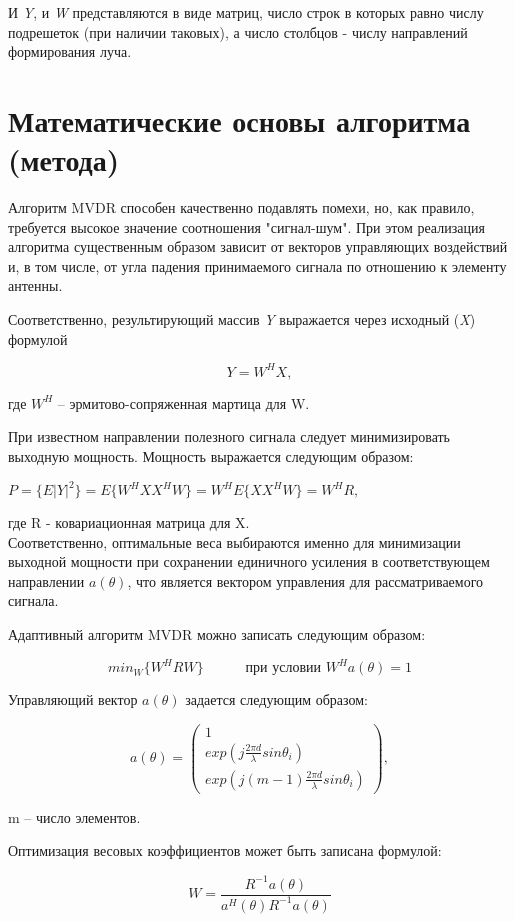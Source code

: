 \documentclass{article}
\begin{document}
И \textit{Y}, и \textit{W} представляются в виде матриц, число строк в которых равно числу подрешеток (при наличии таковых), а число столбцов - числу направлений формирования луча.


\section{Математические основы алгоритма (метода)}

Алгоритм MVDR способен качественно подавлять помехи, но, как правило, требуется высокое значение соотношения "сигнал-шум". При этом реализация алгоритма существенным образом зависит от векторов управляющих воздействий и, в том числе, от угла падения принимаемого сигнала по отношению к элементу антенны.

Соответственно, результирующий массив \textit{Y} выражается через исходный (\textit{X}) формулой 

\begin{equation}
Y = W^H X,
\end{equation}

где $W^H$ -- эрмитово-сопряженная мартица для W.

При известном направлении полезного сигнала следует минимизировать выходную мощность. Мощность выражается следующим образом:

\begin{center}
$P = \{E|Y|^2\} = E\{W^H X X^H W\} = W^H E\{X X^H W\} = W^H R,$
\end{center}

где R - ковариационная матрица для X.\\ 

Соответственно, оптимальные веса выбираются именно для минимизации выходной мощности при сохранении единичного усиления в соответствующем направлении $a(\theta)$, что является вектором управления для рассматриваемого сигнала.

Адаптивный алгоритм MVDR можно записать следующим образом:

\begin{equation}
min_W \{W^H R W\} \text{  }\text{  } \text{  }\text{  }\text{          при условии } W^H a(\theta) = 1
\end{equation}

Управляющий вектор $a(\theta)$ задается следующим образом:

\begin{equation}
a(\theta) = \begin{pmatrix} 1 \\ exp(j \frac{2 \pi d}{\lambda} sin\theta_i) \\ exp(j(m-1) \frac{2 \pi d}{\lambda} sin\theta_i) \end{pmatrix},
\end{equation}

m -- число элементов.

Оптимизация весовых коэффициентов может быть записана  формулой:

\begin{equation}
W=\frac{R^{-1}a(\theta)}{a^H(\theta)R^{-1}a(\theta)}
\end{equation}
\end{document}
